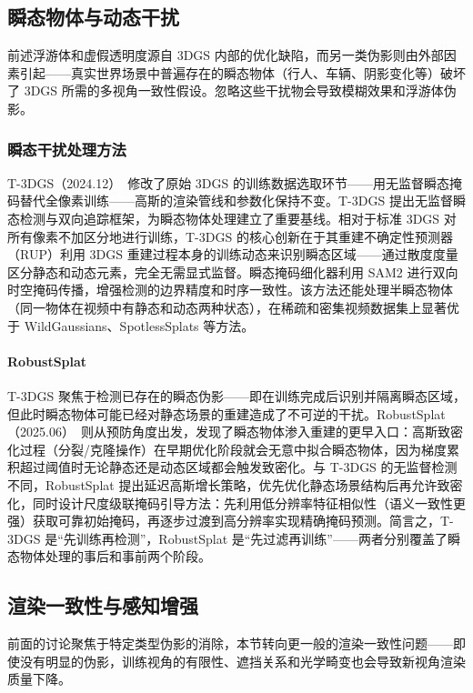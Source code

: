\subsection{瞬态物体与动态干扰}

前述浮游体和虚假透明度源自 3DGS 内部的优化缺陷，而另一类伪影则由外部因素引起——真实世界场景中普遍存在的瞬态物体（行人、车辆、阴影变化等）破坏了 3DGS 所需的多视角一致性假设。忽略这些干扰物会导致模糊效果和浮游体伪影。

\subsubsection{瞬态干扰处理方法}

T-3DGS（2024.12）~\cite{2412_00155}修改了原始 3DGS 的训练数据选取环节——用无监督瞬态掩码替代全像素训练——高斯的渲染管线和参数化保持不变。T-3DGS 提出无监督瞬态检测与双向追踪框架，为瞬态物体处理建立了重要基线。相对于标准 3DGS 对所有像素不加区分地进行训练，T-3DGS 的核心创新在于其重建不确定性预测器（RUP）利用 3DGS 重建过程本身的训练动态来识别瞬态区域——通过散度度量区分静态和动态元素，完全无需显式监督。瞬态掩码细化器利用 SAM2 进行双向时空掩码传播，增强检测的边界精度和时序一致性。该方法还能处理半瞬态物体（同一物体在视频中有静态和动态两种状态），在稀疏和密集视频数据集上显著优于 WildGaussians、SpotlessSplats 等方法。

\paragraph{RobustSplat}
T-3DGS 聚焦于检测已存在的瞬态伪影——即在训练完成后识别并隔离瞬态区域，但此时瞬态物体可能已经对静态场景的重建造成了不可逆的干扰。RobustSplat（2025.06）~\cite{2506_02751}则从预防角度出发，发现了瞬态物体渗入重建的更早入口：高斯致密化过程（分裂/克隆操作）在早期优化阶段就会无意中拟合瞬态物体，因为梯度累积超过阈值时无论静态还是动态区域都会触发致密化。与 T-3DGS 的无监督检测不同，RobustSplat 提出延迟高斯增长策略，优先优化静态场景结构后再允许致密化，同时设计尺度级联掩码引导方法：先利用低分辨率特征相似性（语义一致性更强）获取可靠初始掩码，再逐步过渡到高分辨率实现精确掩码预测。简言之，T-3DGS 是``先训练再检测''，RobustSplat 是``先过滤再训练''——两者分别覆盖了瞬态物体处理的事后和事前两个阶段。

\subsection{渲染一致性与感知增强}

前面的讨论聚焦于特定类型伪影的消除，本节转向更一般的渲染一致性问题——即使没有明显的伪影，训练视角的有限性、遮挡关系和光学畸变也会导致新视角渲染质量下降。

